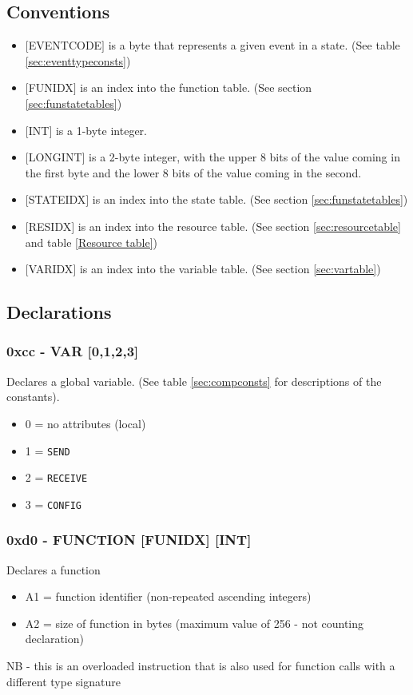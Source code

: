 \documentclass[12pt,a4paper]{scrbook}
\begin{document}
\subsection{Conventions}
\begin{itemize}
\item $[$EVENTCODE$]$ is a byte that represents a given event in a state. (See 
		table \ref{sec:eventtypeconsts})
\item $[$FUNIDX$]$ is an index into the function table. (See section \ref{sec:funstatetables})
\item $[$INT$]$ is a 1-byte integer.  
\item $[$LONGINT$]$ is a 2-byte integer, with the upper 8 bits of the value coming in the first byte 
		and the lower 8 bits of the value coming in the second.
\item $[$STATEIDX$]$ is an index into the state table. (See section \ref{sec:funstatetables})
\item $[$RESIDX$]$ is an index into the resource table. (See section \ref{sec:resourcetable} and 
		table \ref{Resource table})
\item $[$VARIDX$]$ is an index into the variable table. (See section \ref{sec:vartable})
\end{itemize}



\subsection{Declarations}

\subsubsection{0xcc - VAR [0,1,2,3]} 
Declares a global variable.  (See table \ref{sec:compconsts} for descriptions of the constants).
\begin{itemize}
\item 0 = no attributes (local)
\item 1 = \texttt{SEND}
\item 2 = \texttt{RECEIVE}
\item 3 = \texttt{CONFIG}
\end{itemize}

\subsubsection{0xd0 - FUNCTION [FUNIDX] [INT]}
Declares a function
\begin{itemize}
\item A1 = function identifier (non-repeated ascending integers)
\item A2 = size of function in bytes (maximum value of 256 - not counting declaration)
\end{itemize}
NB - this is an overloaded instruction that is also used for function calls with a different type
signature
\end{document}
